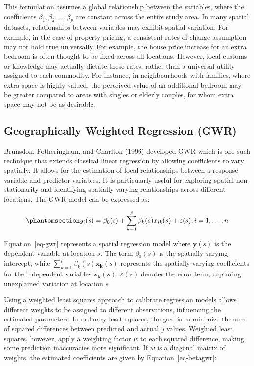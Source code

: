 \documentclass[
  default,
]{sn-jnl}
\begin{document}
This formulation assumes a global relationship between the variables,
where the coefficients \(\beta_1,\beta_2, \dots, \beta_p\) are constant
across the entire study area. In many spatial datasets, relationships
between variables may exhibit spatial variation. For example, in the
case of property pricing, a consistent rates of change assumption may
not hold true universally. For example, the house price increase for an
extra bedroom is often thought to be fixed across all locations.
However, local customs or knowledge may actually dictate these rates,
rather than a universal utility assigned to each commodity. For
instance, in neighbourhoods with families, where extra space is highly
valued, the perceived value of an additional bedroom may be greater
compared to areas with singles or elderly couples, for whom extra space
may not be as desirable.

\subsection{Geographically Weighted Regression
(GWR)}\label{geographically-weighted-regression-gwr}

Brunsdon, Fotheringham, and Charlton (1996) developed GWR which is one
such technique that extends classical linear regression by allowing
coefficients to vary spatially. It allows for the estimation of local
relationships between a response variable and predictor variables. It is
particularly useful for exploring spatial non-stationarity and
identifying spatially varying relationships across different locations.
The GWR model can be expressed as:

\begin{equation}\phantomsection\label{eq-gwr}{
y_i(s) = \beta_{0}(s) + \sum_{k=1}^p \beta_k(s)x_{ik}(s) + \varepsilon(s), \\ i = 1,\dots, n
}\end{equation}

Equation~\ref{eq-gwr} represents a spatial regression model where
\(\mathbf{y}(s)\) is the dependent variable at location \(s\). The term
\(\beta_{0}(s)\) is the spatially varying intercept, while
\(\sum_{k=1}^p \beta_k(s)\mathbf{x_k}(s)\) represents the spatially
varying coefficients for the independent variables \(\mathbf{x_k}(s)\).
\(\varepsilon(s)\) denotes the error term, capturing unexplained
variation at location \(s\)

Using a weighted least squares approach to calibrate regression models
allows different weights to be assigned to different observations,
influencing the estimated parameters. In ordinary least squares, the
goal is to minimize the sum of squared differences between predicted and
actual \(y\) values. Weighted least squares, however, apply a weighting
factor \(w\) to each squared difference, making some prediction
inaccuracies more significant. If \(w\) is a diagonal matrix of weights,
the estimated coefficients are given by Equation~\ref{eq-betagwr}:
\end{document}
